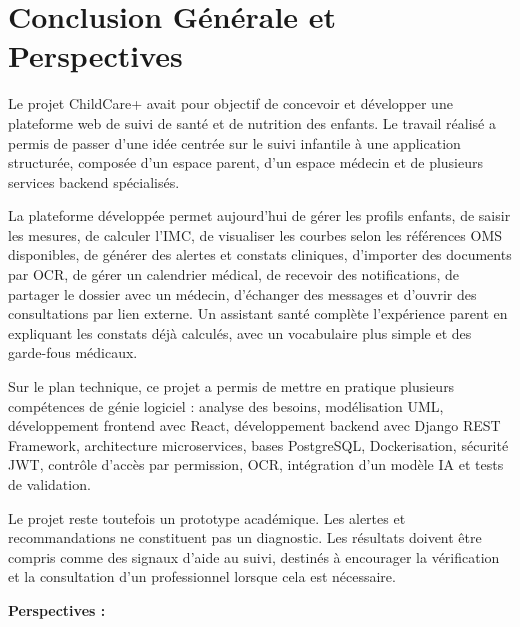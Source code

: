 \chapter*{Conclusion Générale et Perspectives}

Le projet ChildCare+ avait pour objectif de concevoir et développer une plateforme web de suivi de santé et de nutrition des enfants. Le travail réalisé a permis de passer d'une idée centrée sur le suivi infantile à une application structurée, composée d'un espace parent, d'un espace médecin et de plusieurs services backend spécialisés.

La plateforme développée permet aujourd'hui de gérer les profils enfants, de saisir les mesures, de calculer l'IMC, de visualiser les courbes selon les références OMS disponibles, de générer des alertes et constats cliniques, d'importer des documents par OCR, de gérer un calendrier médical, de recevoir des notifications, de partager le dossier avec un médecin, d'échanger des messages et d'ouvrir des consultations par lien externe. Un assistant santé complète l'expérience parent en expliquant les constats déjà calculés, avec un vocabulaire plus simple et des garde-fous médicaux.

Sur le plan technique, ce projet a permis de mettre en pratique plusieurs compétences de génie logiciel : analyse des besoins, modélisation UML, développement frontend avec React, développement backend avec Django REST Framework, architecture microservices, bases PostgreSQL, Dockerisation, sécurité JWT, contrôle d'accès par permission, OCR, intégration d'un modèle IA et tests de validation.

Le projet reste toutefois un prototype académique. Les alertes et recommandations ne constituent pas un diagnostic. Les résultats doivent être compris comme des signaux d'aide au suivi, destinés à encourager la vérification et la consultation d'un professionnel lorsque cela est nécessaire.

\vspace{0.4cm}
\textbf{Perspectives :}

